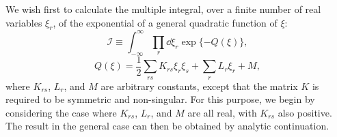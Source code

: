 

We wish first to calculate the multiple integral, over a finite number of
real variables $\xi_r$, of the exponential of a general quadratic function
of $\xi$:
\begin{equation}
  \mathcal{I}\equiv\int_{-\infty}^{\infty}\prod_r \dd\xi_r
  \exp\{-Q(\xi)\},
  \tag{9.A.1}\label{eq:9.A.1}
\end{equation}
\begin{equation}
  Q(\xi)=\frac{1}{2}\sum_{rs}K_{rs}\xi_r\xi_s
  +\sum_r L_r\xi_r+M,
  \tag{9.A.2}\label{eq:9.A.2}
\end{equation}
where $K_{rs}$, $L_r$, and $M$ are arbitrary constants, except that the
matrix $K$ is required to be symmetric and non-singular. For this purpose,
we begin by considering the case where $K_{rs}$, $L_r$, and $M$ are all
real, with $K_{rs}$ also positive. The result in the general case can then
be obtained by analytic continuation.

